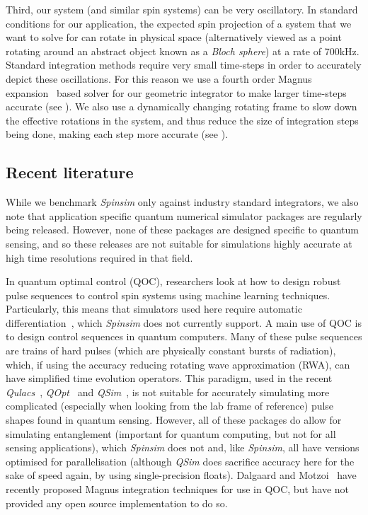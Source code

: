 \documentclass{jors}
\begin{document}
	Third, our system (and similar spin systems) can be very oscillatory.
	In standard conditions for our application, the expected spin projection of a system that we want to solve for can rotate in physical space (alternatively viewed as a point rotating around an abstract object known as a \emph{Bloch sphere}) at a rate of 700kHz. %
	Standard integration methods require very small time-steps in order to accurately depict these oscillations.
	For this reason we use a fourth order Magnus expansion~\cite{magnus_exponential_1954,blanes_magnus_2009} based solver for our geometric integrator to make larger time-steps accurate (see \emph{}).
	We also use a dynamically changing rotating frame to slow down the effective rotations in the system, and thus reduce the size of integration steps being done, making each step more accurate (see \emph{}).


	

	\subsection{Recent literature} %
		While we benchmark \emph{Spinsim} only against industry standard integrators, we also note that application specific quantum numerical simulator packages are regularly being released.
		However, none of these packages are designed specific to quantum sensing, and so these releases are not suitable for simulations highly accurate at high time resolutions required in that field.

		In quantum optimal control (QOC), researchers look at how to design robust pulse sequences to control spin systems using machine learning techniques.
		Particularly, this means that simulators used here require automatic differentiation~\cite{griewank_who_2012}, which \emph{Spinsim} does not currently support.
		A main use of QOC is to design control sequences in quantum computers.
		Many of these pulse sequences are trains of hard pulses (which are physically constant bursts of radiation), which, if using the accuracy reducing rotating wave approximation (RWA), can have simplified time evolution operators.
		This paradigm, used in the recent \emph{Qulacs}~\cite{suzuki_qulacs_2021}, \emph{QOpt}~\cite{teske_qopt_2021} and \emph{QSim}~\cite{isakov_simulations_2021}, is not suitable for accurately simulating more complicated (especially when looking from the lab frame of reference) pulse shapes found in quantum sensing.
		However, all of these packages do allow for simulating entanglement (important for quantum computing, but not for all sensing applications), which \emph{Spinsim} does not and, like \emph{Spinsim}, all have versions optimised for parallelisation (although \emph{QSim} does sacrifice accuracy here for the sake of speed again, by using single-precision floats).
		Dalgaard and Motzoi~\cite{dalgaard_fast_2021} have recently proposed Magnus integration techniques for use in QOC, but have not provided any open source implementation to do so.
\end{document}
